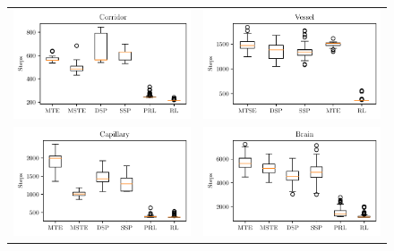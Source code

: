 \begin{figure}[htp]
    \begin{center}
        \begin{tabular}{cc}
            \includegraphics[clip, width=0.45\columnwidth]{figures/evaluation/baseline/plot_map0318_MostDistancedPairFinderAlgorithm.pdf} &
            \includegraphics[clip, width=0.45\columnwidth]{figures/evaluation/baseline/plot_vessel_MostDistancedPairFinderAlgorithm.pdf} \\
            \includegraphics[clip, width=0.45\columnwidth]{figures/evaluation/baseline/plot_map0518_MostDistancedPairFinderAlgorithm.pdf} &
            \includegraphics[clip, width=0.45\columnwidth]{figures/evaluation/baseline/plot_map0122_RandomPairFinderAlgorithm.pdf} \\
        \end{tabular}


\end{center}
\end{figure}
